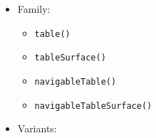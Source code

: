 \begin{itemize}
\tightlist
\item
  Family:

  \begin{itemize}
  \tightlist
  \item
    \texttt{t\allowbreak{}a\allowbreak{}b\allowbreak{}l\allowbreak{}e\allowbreak{}(\allowbreak{})}
  \item
    \texttt{t\allowbreak{}a\allowbreak{}b\allowbreak{}l\allowbreak{}e\allowbreak{}S\allowbreak{}u\allowbreak{}r\allowbreak{}f\allowbreak{}a\allowbreak{}c\allowbreak{}e\allowbreak{}(\allowbreak{})}
  \item
    \texttt{n\allowbreak{}a\allowbreak{}v\allowbreak{}i\allowbreak{}g\allowbreak{}a\allowbreak{}b\allowbreak{}l\allowbreak{}e\allowbreak{}T\allowbreak{}a\allowbreak{}b\allowbreak{}l\allowbreak{}e\allowbreak{}(\allowbreak{})}
  \item
    \texttt{n\allowbreak{}a\allowbreak{}v\allowbreak{}i\allowbreak{}g\allowbreak{}a\allowbreak{}b\allowbreak{}l\allowbreak{}e\allowbreak{}T\allowbreak{}a\allowbreak{}b\allowbreak{}l\allowbreak{}e\allowbreak{}S\allowbreak{}u\allowbreak{}r\allowbreak{}f\allowbreak{}a\allowbreak{}c\allowbreak{}e\allowbreak{}(\allowbreak{})}
  \end{itemize}
\item
  Variants:


\end{itemize}
